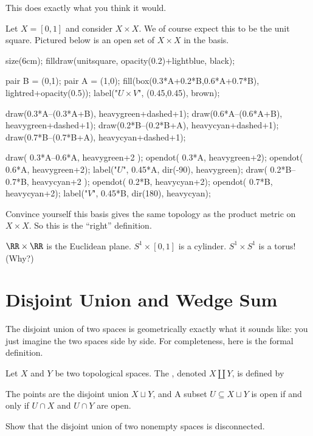 \documentclass[11pt]{scrreprt}
\begin{document}
This does exactly what you think it would.
\begin{example}
	Let $X = [0,1]$ and consider $X \times X$.
	We of course expect this to be the unit square.
	Pictured below is an open set of $X \times X$ in the basis.
	\begin{center}
		\begin{asy}
		size(6cm);
		filldraw(unitsquare, opacity(0.2)+lightblue, black);

		pair B = (0,1);
		pair A = (1,0);
		fill(box(0.3*A+0.2*B,0.6*A+0.7*B), lightred+opacity(0.5));
		label("$U \times V$", (0.45,0.45), brown);

		draw(0.3*A--(0.3*A+B), heavygreen+dashed+1);
		draw(0.6*A--(0.6*A+B), heavygreen+dashed+1);
		draw(0.2*B--(0.2*B+A), heavycyan+dashed+1);
		draw(0.7*B--(0.7*B+A), heavycyan+dashed+1);

		draw( 0.3*A--0.6*A, heavygreen+2 );
		opendot( 0.3*A,  heavygreen+2);
		opendot( 0.6*A, heavygreen+2);
		label("$U$", 0.45*A, dir(-90), heavygreen);
		draw( 0.2*B--0.7*B, heavycyan+2 );
		opendot( 0.2*B, heavycyan+2);
		opendot( 0.7*B, heavycyan+2);
		label("$V$", 0.45*B, dir(180), heavycyan);
		\end{asy}
	\end{center}
\end{example}
\begin{exercise}
	Convince yourself this basis gives the same topology
	as the product metric on $X \times X$.
	So this is the ``right'' definition.
\end{exercise}

\begin{example}
	\listhack
	\begin{enumerate}[(a)]
		\ii $\RR \times \RR$ is the Euclidean plane.
		\ii $S^1 \times [0,1]$ is a cylinder.
		\ii $S^1 \times S^1$ is a torus! (Why?)
	\end{enumerate}
\end{example}

\section{Disjoint Union and Wedge Sum}

The disjoint union of two spaces is geometrically exactly
what it sounds like: you just imagine the two spaces side by side.
For completeness, here is the formal definition.
\begin{definition}
	Let $X$ and $Y$ be two topological spaces.
	The , denoted $X \amalg Y$, is defined by
	\begin{itemize}
		\ii The points are the disjoint union $X \sqcup Y$, and
		\ii A subset $U \subseteq X \sqcup Y$ is open if
		and only if $U \cap X$ and $U \cap Y$ are open.
	\end{itemize}
\end{definition}
\begin{exercise}
	Show that the disjoint union of two nonempty spaces is disconnected.
\end{exercise}
\end{document}
